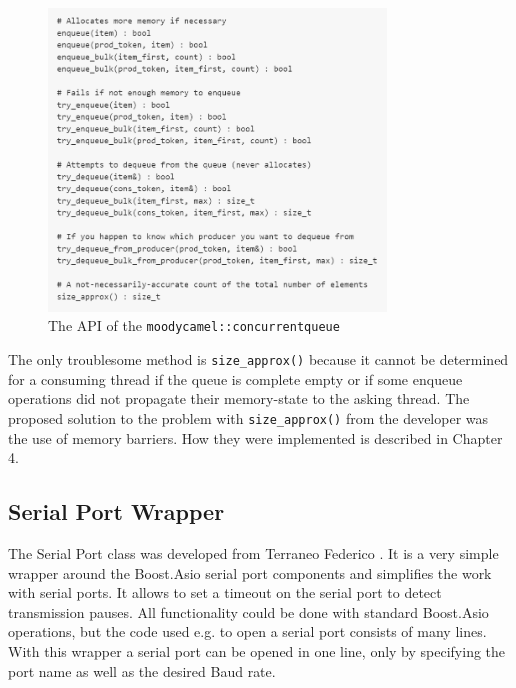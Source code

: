 \begin{figure}[h]
\centering
      \includegraphics[width=0.8\textwidth]{moody}
        \caption{The API of the \texttt{moodycamel::concurrentqueue}}
\end{figure}

The only troublesome method is \texttt{size\_approx()} because it cannot be determined for a consuming thread if the queue is complete empty or if some enqueue operations did not propagate their memory-state to the asking thread. The proposed solution to the problem with \texttt{size\_approx()} from the developer was the use of memory barriers. How they were implemented is described in Chapter 4.
\subsection{Serial Port Wrapper}
The Serial Port class was developed from Terraneo Federico \cite{serport}. It is a very simple wrapper around the Boost.Asio serial port components and simplifies the work with serial ports. It allows to set a timeout on the serial port to detect transmission pauses. All functionality could be done with standard Boost.Asio operations, but the code used e.g. to open a serial port consists of many lines. With this wrapper a serial port can be opened in one line, only by specifying the port name as well as the desired Baud rate.